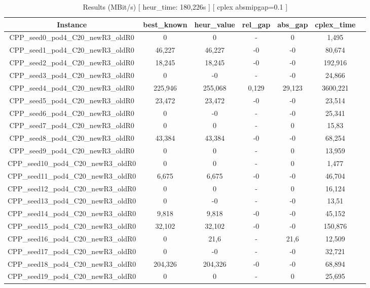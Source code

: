 \documentclass[a4paper]{article}
\begin{document}
\begin{center}
\begin{longtable}{ccccccc}
\caption{Results (MBit/s) [ heur\_time: 180,226s ]  [ cplex absmipgap=0.1 ]}
\tabularnewline
\hline
Instance & best\_known & heur\_value & rel\_gap & abs\_gap & cplex\_time\\
\hline
CPP\_seed0\_pod4\_C20\_newR3\_oldR0 & 0 & 0 & - & 0 & 1,495\\
\hline
CPP\_seed1\_pod4\_C20\_newR3\_oldR0 & 46,227 & 46,227 & -0 & -0 & 80,674\\
\hline
CPP\_seed2\_pod4\_C20\_newR3\_oldR0 & 18,245 & 18,245 & -0 & -0 & 192,916\\
\hline
CPP\_seed3\_pod4\_C20\_newR3\_oldR0 & 0 & -0 & - & -0 & 24,866\\
\hline
CPP\_seed4\_pod4\_C20\_newR3\_oldR0 & 225,946 & 255,068 & 0,129 & 29,123 & 3600,221\\
\hline
CPP\_seed5\_pod4\_C20\_newR3\_oldR0 & 23,472 & 23,472 & -0 & -0 & 23,514\\
\hline
CPP\_seed6\_pod4\_C20\_newR3\_oldR0 & 0 & -0 & - & -0 & 25,341\\
\hline
CPP\_seed7\_pod4\_C20\_newR3\_oldR0 & 0 & 0 & - & 0 & 15,83\\
\hline
CPP\_seed8\_pod4\_C20\_newR3\_oldR0 & 43,384 & 43,384 & -0 & -0 & 68,254\\
\hline
CPP\_seed9\_pod4\_C20\_newR3\_oldR0 & 0 & 0 & - & 0 & 13,959\\
\hline
CPP\_seed10\_pod4\_C20\_newR3\_oldR0 & 0 & 0 & - & 0 & 1,477\\
\hline
CPP\_seed11\_pod4\_C20\_newR3\_oldR0 & 6,675 & 6,675 & -0 & -0 & 46,704\\
\hline
CPP\_seed12\_pod4\_C20\_newR3\_oldR0 & 0 & 0 & - & 0 & 16,124\\
\hline
CPP\_seed13\_pod4\_C20\_newR3\_oldR0 & 0 & -0 & - & -0 & 13,51\\
\hline
CPP\_seed14\_pod4\_C20\_newR3\_oldR0 & 9,818 & 9,818 & -0 & -0 & 45,152\\
\hline
CPP\_seed15\_pod4\_C20\_newR3\_oldR0 & 32,102 & 32,102 & -0 & -0 & 150,876\\
\hline
CPP\_seed16\_pod4\_C20\_newR3\_oldR0 & 0 & 21,6 & - & 21,6 & 12,509\\
\hline
CPP\_seed17\_pod4\_C20\_newR3\_oldR0 & 0 & -0 & - & -0 & 32,721\\
\hline
CPP\_seed18\_pod4\_C20\_newR3\_oldR0 & 204,326 & 204,326 & -0 & -0 & 68,894\\
\hline
CPP\_seed19\_pod4\_C20\_newR3\_oldR0 & 0 & 0 & - & 0 & 25,695\\

\end{longtable}
\end{center}
\end{document}
